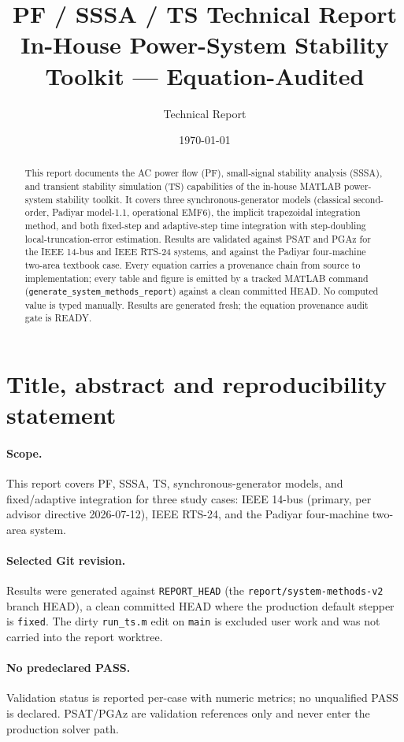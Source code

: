 \documentclass[12pt,a4paper]{article}
\title{\textbf{PF / SSSA / TS Technical Report}\\
\large In-House Power-System Stability Toolkit --- Equation-Audited}
\author{Technical Report}
\date{\today}
\begin{document}
\maketitle

\begin{abstract}
This report documents the AC power flow (PF), small-signal stability analysis
(SSSA), and transient stability simulation (TS) capabilities of the in-house
MATLAB power-system stability toolkit. It covers three synchronous-generator
models (classical second-order, Padiyar model-1.1, operational EMF6), the
implicit trapezoidal integration method, and both fixed-step and adaptive-step
time integration with step-doubling local-truncation-error estimation. Results
are validated against PSAT and PGAz for the IEEE 14-bus and IEEE RTS-24 systems,
and against the Padiyar four-machine two-area textbook case. Every equation
carries a provenance chain from source to implementation; every table and
figure is emitted by a tracked MATLAB command (\texttt{generate\_system\_methods\_report})
against a clean committed HEAD. No computed value is typed manually. Results
are generated fresh; the equation provenance audit gate is READY.
\end{abstract}

\section{Title, abstract and reproducibility statement}

\paragraph{Scope.} This report covers PF, SSSA, TS, synchronous-generator
models, and fixed/adaptive integration for three study cases: IEEE 14-bus
(primary, per advisor directive 2026-07-12), IEEE RTS-24, and the Padiyar
four-machine two-area system.

\paragraph{Selected Git revision.} Results were generated against
\texttt{REPORT\_HEAD} (the \texttt{report/system-methods-v2} branch HEAD),
a clean committed HEAD where the production default stepper is \texttt{fixed}.
The dirty \texttt{run\_ts.m} edit on \texttt{main} is excluded user work and
was not carried into the report worktree.

\paragraph{No predeclared PASS.} Validation status is reported per-case with
numeric metrics; no unqualified PASS is declared. PSAT/PGAz are validation
references only and never enter the production solver path.
\end{document}
